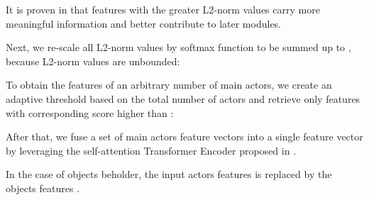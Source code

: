 \documentclass[sn-mathphys]{sn-jnl}
\theoremstyle{thmstyleone}\newtheorem{theorem}{Theorem}\newtheorem{proposition}[theorem]{Proposition}
\theoremstyle{thmstyletwo}\newtheorem{example}{Example}\newtheorem{remark}{Remark}
\theoremstyle{thmstylethree}\newtheorem{definition}{Definition}
\begin{document}
It is proven in \cite{adahard_eccv2018} that features with the greater L2-norm values carry more meaningful information and better contribute to later modules. 



Next, we re-scale all L2-norm values by softmax function to be summed up to , because L2-norm values are unbounded:


To obtain the features of an arbitrary number of main actors, we create an adaptive threshold based on the total number of actors  and retrieve only features  with corresponding score higher than :


After that, we fuse a set of main actors feature vectors  into a single feature vector  by leveraging the self-attention Transformer Encoder proposed in \cite{attention_is_all_you_need}.


In the case of objects beholder, the input actors features  is replaced by the objects features .

\begin{table}[!t]
\centering
\caption{The detailed architecture of BMM with three components.  is the input feature obtained from PMR.  and  are the temporal length of the video and maximum duration of proposals in terms of the number of snippets.} 
\label{tab:AOE-BMM}
\end{table}
\end{document}
